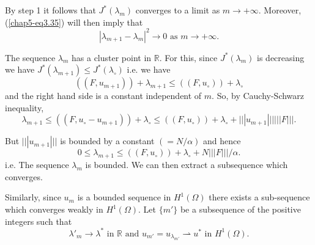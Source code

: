 \begin{step}\label{chap5-step2}
By step 1 it follows that $J^{*} (\lambda_{m})$ converges to a limit as $m \to + \infty$. Moreover, (\ref{chap5-eq3.35}) will then imply that
\begin{equation*}
|\lambda_{m+1} - \lambda_{m}|^{2} \to 0 \text{ as } m \to + \infty.\tag{3.36}\label{chap5-eq3.36}
\end{equation*}
\end{step}

\begin{step}\label{chap5-step3}
The sequence $\lambda_{m}$ has a cluster point in $\mathbb{R}$. For this, since $J^{*} (\lambda_{m})$ is decreasing we have
$J^{*} (\lambda_{m+1}) \leq J^{*}(\lambda_{\circ})$ i.e. we have
$$
((F, u_{m+1})) + \lambda_{m+1} \leq ((F, u_{\circ})) + \lambda_{\circ}
$$\pageoriginale
and the right hand side is a constant independent of $m$. So, by Cauchy-Schwarz inequality,
$$
\lambda_{m+1} \leq ((F, u_{\circ} - u_{m+1})) + \lambda_{\circ} \leq ((F, u_{\circ})) + \lambda_{\circ} + |||u_{m+1}||| |||F|||.
$$

But $|||u_{m+1}|||$ is bounded by a constant $(= N/\alpha)$ and hence
$$
0 \leq \lambda_{m+1} \leq ((F, u_{\circ})) + \lambda_{\circ} + N|||F||| / \alpha.
$$
i.e. The sequence $\lambda_{m}$ is bounded. We can then extract a subsequence which converges.

Similarly, since $u_{m}$ is a bounded sequence in $H^{1}(\Omega)$ there exists a sub-sequence which converges weakly in $H^{1}(\Omega)$. Let $\{ m' \}$ be a subsequence of the positive integers such that
$$
\lambda'_{m} \to \lambda^{*} \text{ in } \mathbb{R} \text{ and } u_{m'} = u_{\lambda_{m'}} \rightharpoonup u^{*} \text{ in } H^{1}(\Omega).
$$
\end{step}

